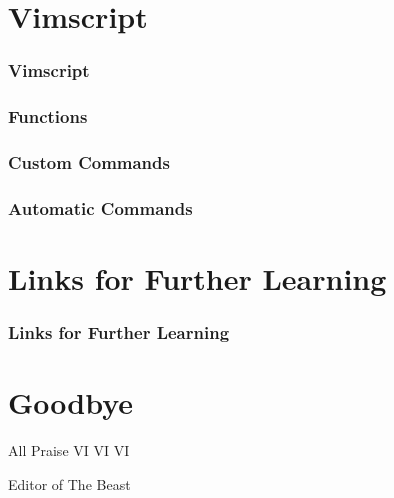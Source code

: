 \documentclass{beamer}
\begin{document}
\section{Vimscript}
\begin{frame}[fragile]
    \frametitle{Vimscript}
    \tableofcontents[currentsection]
\end{frame}

\begin{frame}[fragile]
    \frametitle{Functions}
    \small
\end{frame}

\begin{frame}[fragile]
    \frametitle{Custom Commands}
    \small
\end{frame}

\begin{frame}[fragile]
    \frametitle{Automatic Commands}
    \small
\end{frame}

\section{Links for Further Learning}

\begin{frame}[fragile]
    \frametitle{Links for Further Learning}
    \small
\end{frame}

\section{Goodbye}

\begin{frame}[fragile]
    \centerline{\huge All Praise VI VI VI}
    \vspace{0.5cm}
    \centerline{\huge Editor of The Beast}
    \begin{figure}
	\centering
	\qquad
    \end{figure}
\end{frame}
\end{document}
